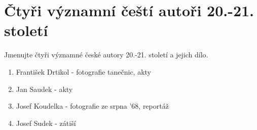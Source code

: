 \section{Čtyři významní čeští autoři 20.-21. století}
Jmenujte čtyři významné české autory 20.-21. století a jejich dílo.
\begin{enumerate}
    \item František Drtikol - fotografie tanečnic, akty
    \item Jan Saudek - akty
    \item Josef Koudelka - fotografie ze srpna '68, reportáž
    \item Josef Sudek - zátiší
\end{enumerate}